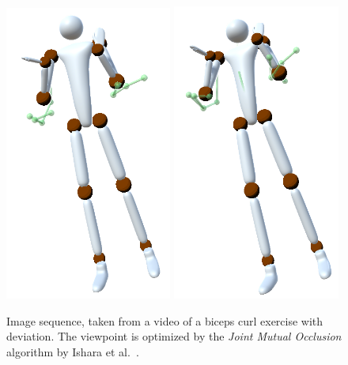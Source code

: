 \begin{figure}[th]
	\includegraphics[width=0.12\linewidth]{pictures/jmoSequence7.png}\hfill
	\includegraphics[width=0.12\linewidth]{pictures/jmoSequence8.png}\hfill
	\caption{Image sequence, taken from a video of a biceps curl exercise with deviation. The viewpoint is optimized by the \emph{Joint Mutual Occlusion} algorithm by Ishara et al.~\cite{ishara2015mra}.}
	\label{fig:jmoSequence}
\end{figure}

